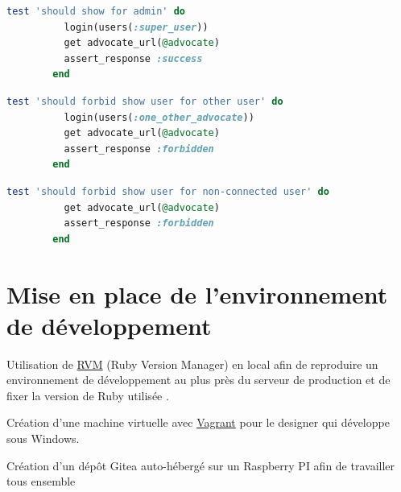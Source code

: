 \documentclass[]{report}
\begin{document}
      \begin{scriptsize}
        \begin{lstlisting}[language=ruby, caption={Test qu'un administrateur peut accéder au profil d'un avocat}, label={lst:test_admin}]
        test 'should show for admin' do
          login(users(:super_user))
          get advocate_url(@advocate)
          assert_response :success
        end
        \end{lstlisting}
      \end{scriptsize}

      \begin{scriptsize}
        \begin{lstlisting}[language=ruby, caption={Test qu'un utilisateur non-connecté ne peut pas accéder au profil d'un autre utilisateur}, label={lst:test_other}]
        test 'should forbid show user for other user' do
          login(users(:one_other_advocate))
          get advocate_url(@advocate)
          assert_response :forbidden
        end
        \end{lstlisting}
      \end{scriptsize}

      \begin{scriptsize}
        \begin{lstlisting}[language=ruby, caption={Test qu'un utilisateur connecté ne peut pas accéder au profil d'un autre utilisateur}, label={lst:test_unconnected}]
        test 'should forbid show user for non-connected user' do
          get advocate_url(@advocate)
          assert_response :forbidden
        end
        \end{lstlisting}
      \end{scriptsize}


  \section{Mise en place de l'environnement de développement}

    Utilisation de \href{https://rvm.io}{RVM} (Ruby Version Manager) en local afin de reproduire un environnement de développement au plus près du serveur de production et de fixer la version de Ruby utilisée .

    Création d'une machine virtuelle avec \href{https://www.vagrantup.com}{Vagrant} pour le designer qui développe sous Windows.

    Création d'un dépôt Gitea auto-hébergé sur un Raspberry PI afin de travailler tous ensemble
\end{document}
